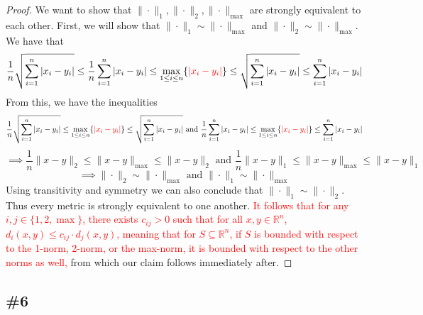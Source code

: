 \documentclass{article}
\theoremstyle{plain} %
\numberwithin{thm}{section} %
\theoremstyle{definition}
\begin{document}
\begin{proof}
            We want to show that \(\|\cdot\|_1, \|\cdot\|_2, \|\cdot\|_{\max}\) are strongly equivalent to each other. First, we will show that \(\|\cdot\|_1 \sim \|\cdot\|_{\max}\) and \(\|\cdot\|_2 \sim \|\cdot\|_{\max}\). We have that
            \[
                \frac{1}{n} \sqrt{\sum_{i=1}^n |x_i - y_i|} \leq \frac{1}{n} \sum_{i=1}^n |x_i - y_i| \leq \max _{1\leq i\leq n} \{\textcolor{red}{|x_i - y_i|}\} \leq \sqrt{\sum_{i=1}^n |x_i - y_i|} \leq \sum_{i=1}^n |x_i - y_i|
            \]
            From this, we have the inequalities
            \[
                \frac{1}{n} \sqrt{\sum_{i=1}^n |x_i - y_i|} \leq \max _{1\leq i\leq n} \{\textcolor{red}{|x_i - y_i|}\} \leq \sqrt{\sum_{i=1}^n |x_i - y_i|} \text{ and } \frac{1}{n} \sum_{i=1}^n |x_i - y_i| \leq \max _{1\leq i\leq n} \{\textcolor{red}{|x_i - y_i|}\} \leq \sum_{i=1}^n |x_i - y_i|
            \]
            \[
                \implies \frac{1}{n} \|x - y\|_2 \leq \|x - y\|_{\max} \leq \|x - y\|_2 \text{ and } \frac{1}{n} \|x - y\|_1 \leq \|x - y\|_{\max} \leq \|x - y\|_1
            \]
            \[
                \implies \|\cdot\|_2 \sim \|\cdot\|_{\max} \text{ and } \|\cdot\|_1 \sim \|\cdot\|_{\max}
            \]
            Using transitivity and symmetry we can also conclude that \(\|\cdot\|_1 \sim \|\cdot\|_2\). Thus every metric is strongly equivalent to one another. \textcolor{red}{It follows that for any \(i,j \in \{1, 2, \max\}\), there exists \(c_{ij} > 0\) such that for all \(x,y \in \mathbb{R}^n\), \(d_i(x,y) \leq c_{ij} \cdot d_j(x,y)\), meaning that for \(S \subseteq \mathbb{R}^n\), if \(S\) is bounded with respect to the 1-norm, 2-norm, or the max-norm, it is bounded with respect to the other norms as well,} from which our claim follows immediately after.

        \end{proof}

        \subsection{\#6}
\end{document}
